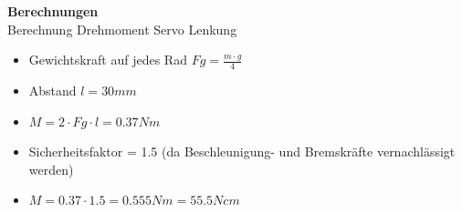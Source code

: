 \textbf{Berechnungen}\\[0.2cm]
Berechnung Drehmoment Servo Lenkung
\begin{itemize}
\item Gewichtskraft auf jedes Rad $Fg = \frac{m\cdot g}{4}$
\item Abstand $l = 30mm$
\item $M = 2\cdot Fg\cdot l = 0.37Nm$
\item Sicherheitsfaktor = 1.5 (da Beschleunigung- und Bremskräfte vernachlässigt werden)
\item $M = 0.37\cdot 1.5 = 0.555Nm = 55.5Ncm$
\end{itemize}